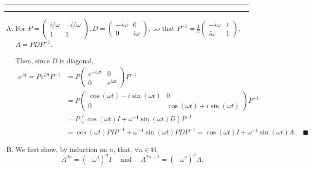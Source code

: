 \documentclass[11pt]{article}
\newcounter{questionCounter}
\newcounter{partCounter}[questionCounter]
\newenvironment{question}[2][\arabic{questionCounter}]{%
    \setcounter{partCounter}{0}%
    \vspace{.25in} \hrule \vspace{0.5em}%
        \noindent{\bf #2}%
    \vspace{0.8em} \hrule \vspace{.10in}%
    \addtocounter{questionCounter}{1}%
}{}
\newcommand{\mqed}{\quad \blacksquare}
\newcommand{\inv}{^{-1}}
\newcommand{\N}{\mathbb{N}} %
\begin{document}
\newpage
\begin{question}{Problem 2}
\begin{enumerate}[(A)]
\item For
$P =
    \begin{pmatrix}
        i/\omega    & -i/\omega \\
        1           & 1
    \end{pmatrix},
D =
    \begin{pmatrix}
        -i\omega    & 0 \\
        0           & i\omega
    \end{pmatrix},
\mbox{ so that }
P\inv = \frac12
    \begin{pmatrix}
        -i\omega    & 1 \\
        i\omega     & 1
    \end{pmatrix}
$, $A = PDP\inv$.

Then, since $D$ is diagonal,
\begin{align*}
e^{At}
   = Pe^{Dt}P\inv
 & = P \begin{pmatrix}
        e^{-i\omega t}    & 0 \\
        0           & e^{i\omega t}
       \end{pmatrix} P\inv \\
 & = P \begin{pmatrix}
        \cos(\omega t) - i\sin(\omega t)   & 0 \\
        0                                   & \cos(\omega t) + i\sin(\omega t)
       \end{pmatrix} P\inv \\
 & = P \left(\cos(\omega t) I + \omega\inv \sin(\omega t) D \right) P\inv \\
 & = \cos(\omega t) PIP\inv + \omega\inv \sin(\omega t) PDP\inv
   = \cos(\omega t) I + \omega\inv \sin(\omega t) A. \mqed
\end{align*}

\item We first show, by induction on $n$, that, $\forall n \in \N$,
\vspace{-0.1in}
\[A^{2n} = (-\omega^2)^n I
\quad \mbox{ and } \quad
A^{2n + 1} = (-\omega^2)^n A.\]
\vspace{-0.3in}


\end{enumerate}
\end{question}
\end{document}
